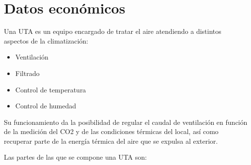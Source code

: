 
\cleardoublepage
\chapter{Datos económicos}

\label{chap:datosEconomicos} %

Una UTA es un equipo encargado de tratar el aire atendiendo a distintos aspectos de la climatización:

\begin{itemize}
    \item Ventilación
    \item Filtrado
    \item Control de temperatura
    \item Control de humedad
\end{itemize}

Su funcionamiento da la posibilidad de regular el caudal de ventilación en función de la medición del CO2 y de las condiciones térmicas del local, así como recuperar parte de la energía térmica del aire que se expulsa al exterior.

Las partes de las que se compone una UTA son:

